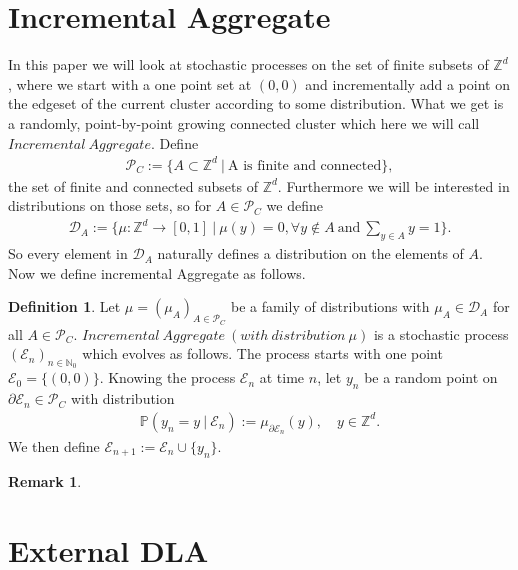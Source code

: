 \documentclass[12pt,a4paper]{scrartcl}
\numberwithin{equation}{section}
\numberwithin{equation}{section}%
\theoremstyle{definition}
\newtheorem{definition}[theorem]{Definition}
\theoremstyle{definition}
\newtheorem{rem}[thm]{Remark}%
\begin{document}
\newpage
\section{Incremental Aggregate}
In this paper we will look at stochastic processes on the set of finite subsets of $\mathbb{Z}^d$, where we start with a one point set at $(0,0)$ and incrementally add a point on the edgeset of the current cluster according to some distribution. What we get is a randomly, point-by-point growing connected cluster which here we will call $\mathit{Incremental\ Aggregate}$. Define 
\begin{align}
	\mathcal{P}_C := \{A\subset \mathbb{Z}^d\ |\ \text{A is finite and connected}\}, 
\end{align}
the set of finite and connected subsets of $\mathbb{Z}^d$. Furthermore we will be interested in distributions on those sets, so for $A\in \mathcal{P}_C$ we define 
\begin{align}
	\mathcal{D}_A:= \{\mu: \mathbb{Z}^d\to [0,1]\ |\ \mu(y) = 0, \forall y\notin A\ \text{and}\ \sum_{y\in A} y = 1 \}.
\end{align}
So every element in $\mathcal{D}_A$ naturally defines a distribution on the elements of $A$. Now we define incremental Aggregate as follows.  

\begin{definition}
	Let $\mu=(\mu_A)_{A\in \mathcal{P}_C}$ be a family of distributions with $\mu_A\in \mathcal{D}_A$ for all $A\in \mathcal{P}_C$. $\mathit{Incremental\ Aggregate\ (with\ distribution\ \mu)}$ is a stochastic process $(\mathcal{E}_n)_{n\in{\mathbb{N}_0}}$ which evolves as follows. The process starts with one point $\mathcal{E}_0 = \{(0,0)\}$. Knowing the process $\mathcal{E}_n$ at time $n$, let $y_n$ be a random point on $\partial \mathcal{E}_n\in \mathcal{P}_C$ with distribution
	\begin{align}
		\mathbb{P}(y_n = y\ |\ \mathcal{E}_n) := \mu_{\partial \mathcal{E}_n}(y),\quad y\in \mathbb{Z}^d.
	\end{align}
	We then define $\mathcal{E}_{n+1} := \mathcal{E}_n \cup \{y_n\}$.
\end{definition} 

\begin{rem}
	
\end{rem}



\newpage

\newpage
\section{External DLA}
\end{document}
